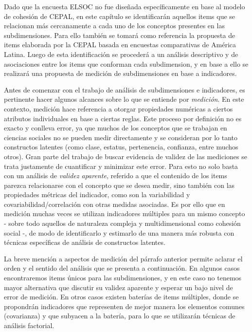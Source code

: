 \documentclass[
  12pt,
]{book}
\begin{document}
Dado que la encuesta ELSOC no fue diseñada específicamente en base al modelo de cohesión de CEPAL, en este capítulo se identificarán aquellos items que se relacionan más cercanamente a cada uno de los conceptos presentes en las subdimensiones. Para ello también se tomará como referencia la propuesta de items elaborada por la CEPAL basada en encuestas comparativas de América Latina. Luego de esta identificación se procederá a un análisis descriptivo y de asociaciones entre los items que conforman cada subdimension, y en base a ello se realizará una propuesta de medición de subdimensiones en base a indicadores.

Antes de comenzar con el trabajo de análisis de subdimensiones e indicadores, es pertinente hacer algunos alcances sobre lo que se entiende por \emph{medición}. En este contexto, medición hace referencia a otorgar propiedades numéricas a ciertos atributos individuales en base a ciertas reglas. Este proceso por definición no es exacto y conlleva error, ya que muchos de los conceptos que se trabajan en ciencias sociales no se pueden medir directamente y se consideran por lo tanto constructos latentes (como clase, estatus, pertenencia, confianza, entre muchos otros). Gran parte del trabajo de buscar evidencia de validez de las mediciones se trata justamente de cuantificar y minimizar este error. Para esto no solo basta con un análisis de \emph{validez aparente}, referido a que el contenido de los items parezca relacionarse con el concepto que se desea medir, sino también con las propiedades métricas del indicador, como son la variabilidad y covariabilidad/correlación con otras medidas asociadas. Es por ello que en medición muchas veces se utilizan indicadores múltiples para un mismo concepto - sobre todo aquellos de naturaleza compleja y multidimensional como cohesión social -, de modo de identificarlo y estimarlo de una manera más robusta con técnicas específicas de análisis de constructos latentes.

La breve mención a aspectos de medición del párrafo anterior permite aclarar el orden y el sentido del análisis que se presenta a continuación. En algunos casos encontraremos items únicos para las subdimensiones, y en este caso no tenemos mayor alternativa que discutir su validez aparente y esperar un bajo nivel de error de medición. En otros casos existen baterías de items múltiples, donde se propondrán indicadores que representen de mejor manera los elementos comunes (covarianza) y que subyacen a la batería, para lo que se utilizarán técnicas de análisis factorial.
\end{document}
